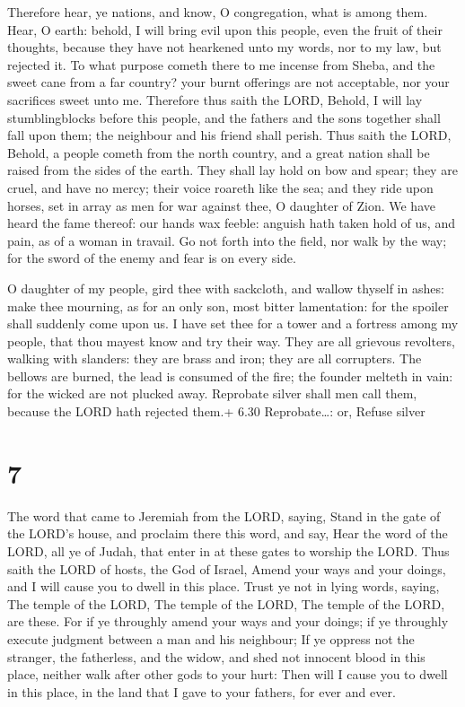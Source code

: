  Therefore hear, ye nations, and know, O congregation,
what is among them.  Hear, O earth: behold, I will bring
evil upon this people, even the fruit of their thoughts, because they
have not hearkened unto my words, nor to my law, but rejected it.
 To what purpose cometh there to me incense from Sheba, and
the sweet cane from a far country? your burnt offerings are not
acceptable, nor your sacrifices sweet unto me.  Therefore
thus saith the LORD, Behold, I will lay stumblingblocks before this
people, and the fathers and the sons together shall fall upon them; the
neighbour and his friend shall perish.  Thus saith the
LORD, Behold, a people cometh from the north country, and a great nation
shall be raised from the sides of the earth.  They shall
lay hold on bow and spear; they are cruel, and have no mercy; their
voice roareth like the sea; and they ride upon horses, set in array as
men for war against thee, O daughter of Zion.  We have
heard the fame thereof: our hands wax feeble: anguish hath taken hold of
us, and pain, as of a woman in travail.  Go not forth into
the field, nor walk by the way; for the sword of the enemy and fear is
on every side.

 O daughter of my people, gird thee with sackcloth, and
wallow thyself in ashes: make thee mourning, as for an only son, most
bitter lamentation: for the spoiler shall suddenly come upon us.
 I have set thee for a tower and a fortress among my
people, that thou mayest know and try their way.  They are
all grievous revolters, walking with slanders: they are brass and iron;
they are all corrupters.  The bellows are burned, the lead
is consumed of the fire; the founder melteth in vain: for the wicked are
not plucked away.  Reprobate silver shall men call them,
because the LORD hath rejected them.+ 6.30 Reprobate\ldots: or, Refuse
silver

\hypertarget{section-6}{%
\section{7}\label{section-6}}

 The word that came to Jeremiah from the LORD, saying,
 Stand in the gate of the LORD's house, and proclaim there
this word, and say, Hear the word of the LORD, all ye of Judah, that
enter in at these gates to worship the LORD.  Thus saith the
LORD of hosts, the God of Israel, Amend your ways and your doings, and I
will cause you to dwell in this place.  Trust ye not in
lying words, saying, The temple of the LORD, The temple of the LORD, The
temple of the LORD, are these.  For if ye throughly amend
your ways and your doings; if ye throughly execute judgment between a
man and his neighbour;  If ye oppress not the stranger, the
fatherless, and the widow, and shed not innocent blood in this place,
neither walk after other gods to your hurt:  Then will I
cause you to dwell in this place, in the land that I gave to your
fathers, for ever and ever.

